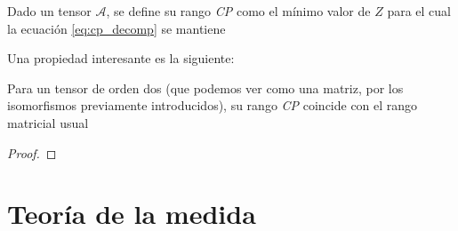\begin{definicion}
    Dado un tensor $\mathcal{A}$, se define su rango \textit{CP} como el mínimo valor de $Z$ para el cual la ecuación \eqref{eq:cp_decomp} se mantiene
\end{definicion}

Una propiedad interesante es la siguiente:

\begin{proposicion}[]
    Para un tensor de orden dos (que podemos ver como una matriz, por los isomorfismos previamente introducidos), su rango \textit{CP} coincide con el rango matricial usual
\end{proposicion}

\begin{proof}


\end{proof}
\section{Teoría de la medida}

\endinput
